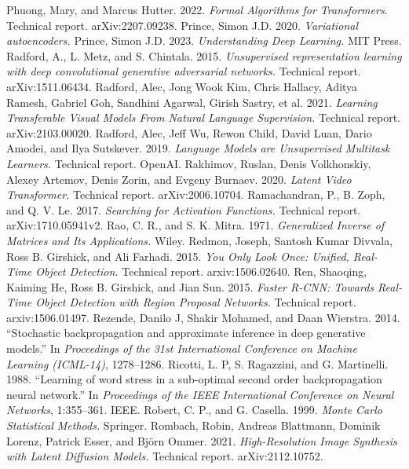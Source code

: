  Phuong, Mary, and Marcus Hutter. 2022. \emph{Formal Algorithms for Transformers.} Technical report. arXiv:2207.09238.
 Prince, Simon J.D. 2020. \emph{Variational autoencoders.}
 Prince, Simon J.D. 2023. \emph{Understanding Deep Learning.} MIT Press.
 Radford, A., L. Metz, and S. Chintala. 2015. \emph{Unsupervised representation learning with deep convolutional generative adversarial networks.} Technical report. arXiv:1511.06434.
 Radford, Alec, Jong Wook Kim, Chris Hallacy, Aditya Ramesh, Gabriel Goh, Sandhini Agarwal, Girish Sastry, et al. 2021. \emph{Learning Transferable Visual Models From Natural Language Supervision.} Technical report. arXiv:2103.00020.
 Radford, Alec, Jeff Wu, Rewon Child, David Luan, Dario Amodei, and Ilya Sutskever. 2019. \emph{Language Models are Unsupervised Multitask Learners.} Technical report. OpenAI.
 Rakhimov, Ruslan, Denis Volkhonskiy, Alexey Artemov, Denis Zorin, and Evgeny Burnaev. 2020. \emph{Latent Video Transformer.} Technical report. arXiv:2006.10704.
 Ramachandran, P., B. Zoph, and Q. V. Le. 2017. \emph{Searching for Activation Functions.} Technical report. arXiv:1710.05941v2.
 Rao, C. R., and S. K. Mitra. 1971. \emph{Generalized Inverse of Matrices and Its Applications.} Wiley.
 Redmon, Joseph, Santosh Kumar Divvala, Ross B. Girshick, and Ali Farhadi. 2015. \emph{You Only Look Once: Unified, Real-Time Object Detection.} Technical report. arxiv:1506.02640.
 Ren, Shaoqing, Kaiming He, Ross B. Girshick, and Jian Sun. 2015. \emph{Faster R-CNN: Towards Real-Time Object Detection with Region Proposal Networks.} Technical report. arxiv:1506.01497.
 Rezende, Danilo J, Shakir Mohamed, and Daan Wierstra. 2014. ``Stochastic backpropagation and approximate inference in deep generative models.'' In \emph{Proceedings of the 31st International Conference on Machine Learning (ICML-14)}, 1278--1286.
 Ricotti, L. P, S. Ragazzini, and G. Martinelli. 1988. ``Learning of word stress in a sub-optimal second order backpropagation neural network.'' In \emph{Proceedings of the IEEE International Conference on Neural Networks}, 1:355--361. IEEE.
 Robert, C. P., and G. Casella. 1999. \emph{Monte Carlo Statistical Methods.} Springer.
 Rombach, Robin, Andreas Blattmann, Dominik Lorenz, Patrick Esser, and Bj\"orn Ommer. 2021. \emph{High-Resolution Image Synthesis with Latent Diffusion Models.} Technical report. arXiv:2112.10752.
